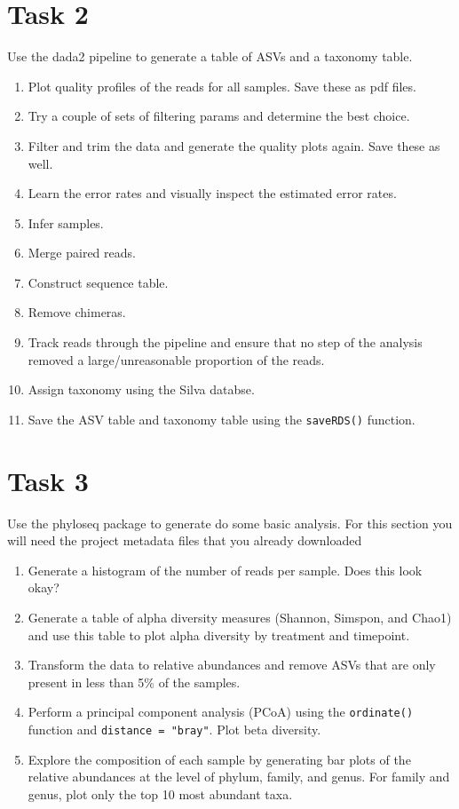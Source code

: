 \documentclass[
]{book}
\providecommand{\tightlist}{%
  \setlength{\itemsep}{0pt}\setlength{\parskip}{0pt}}
\begin{document}
\hypertarget{task-2}{%
\section{Task 2}\label{task-2}}

Use the dada2 pipeline to generate a table of ASVs and a taxonomy table.

\begin{enumerate}
\def\labelenumi{\arabic{enumi}.}
\tightlist
\item
  Plot quality profiles of the reads for all samples. Save these as pdf files.
\item
  Try a couple of sets of filtering params and determine the best choice.
\item
  Filter and trim the data and generate the quality plots again. Save these as well.
\item
  Learn the error rates and visually inspect the estimated error rates.
\item
  Infer samples.
\item
  Merge paired reads.
\item
  Construct sequence table.
\item
  Remove chimeras.
\item
  Track reads through the pipeline and ensure that no step of the analysis removed a large/unreasonable proportion of the reads.
\item
  Assign taxonomy using the Silva databse.
\item
  Save the ASV table and taxonomy table using the \texttt{saveRDS()} function.
\end{enumerate}

\hypertarget{task-3}{%
\section{Task 3}\label{task-3}}

Use the phyloseq package to generate do some basic analysis. For this section you will need the project metadata files that you already downloaded

\begin{enumerate}
\def\labelenumi{\arabic{enumi}.}
\tightlist
\item
  Generate a histogram of the number of reads per sample. Does this look okay?
\item
  Generate a table of alpha diversity measures (Shannon, Simspon, and Chao1) and use this table to plot alpha diversity by treatment and timepoint.
\item
  Transform the data to relative abundances and remove ASVs that are only present in less than 5\% of the samples.
\item
  Perform a principal component analysis (PCoA) using the \texttt{ordinate()} function and \texttt{distance\ =\ "bray"}. Plot beta diversity.
\item
  Explore the composition of each sample by generating bar plots of the relative abundances at the level of phylum, family, and genus. For family and genus, plot only the top 10 most abundant taxa.
\end{enumerate}
\end{document}
